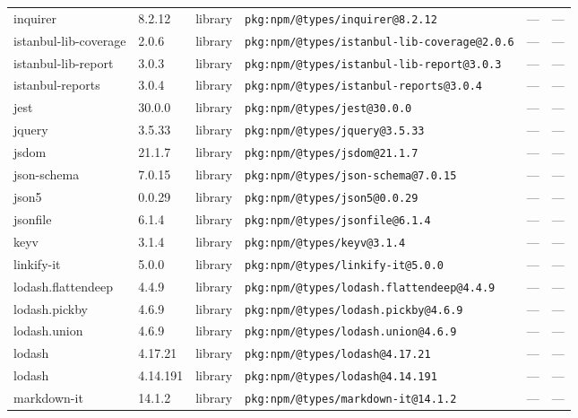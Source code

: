 \documentclass[11pt,a4paper]{article}
\begin{document}
\begin{longtable}{|p{4cm}|p{2cm}|p{1.6cm}|p{5cm}|p{1.5cm}|p{3.5cm}|}
\raggedright inquirer & 8.2.12 & library & \small\texttt{pkg:npm/@types/inquirer@8.2.12} & — & \small — \\
\raggedright istanbul-lib-coverage & 2.0.6 & library & \small\texttt{pkg:npm/@types/istanbul-lib-coverage@2.0.6} & — & \small — \\
\raggedright istanbul-lib-report & 3.0.3 & library & \small\texttt{pkg:npm/@types/istanbul-lib-report@3.0.3} & — & \small — \\
\raggedright istanbul-reports & 3.0.4 & library & \small\texttt{pkg:npm/@types/istanbul-reports@3.0.4} & — & \small — \\
\raggedright jest & 30.0.0 & library & \small\texttt{pkg:npm/@types/jest@30.0.0} & — & \small — \\
\raggedright jquery & 3.5.33 & library & \small\texttt{pkg:npm/@types/jquery@3.5.33} & — & \small — \\
\raggedright jsdom & 21.1.7 & library & \small\texttt{pkg:npm/@types/jsdom@21.1.7} & — & \small — \\
\raggedright json-schema & 7.0.15 & library & \small\texttt{pkg:npm/@types/json-schema@7.0.15} & — & \small — \\
\raggedright json5 & 0.0.29 & library & \small\texttt{pkg:npm/@types/json5@0.0.29} & — & \small — \\
\raggedright jsonfile & 6.1.4 & library & \small\texttt{pkg:npm/@types/jsonfile@6.1.4} & — & \small — \\
\raggedright keyv & 3.1.4 & library & \small\texttt{pkg:npm/@types/keyv@3.1.4} & — & \small — \\
\raggedright linkify-it & 5.0.0 & library & \small\texttt{pkg:npm/@types/linkify-it@5.0.0} & — & \small — \\
\raggedright lodash.flattendeep & 4.4.9 & library & \small\texttt{pkg:npm/@types/lodash.flattendeep@4.4.9} & — & \small — \\
\raggedright lodash.pickby & 4.6.9 & library & \small\texttt{pkg:npm/@types/lodash.pickby@4.6.9} & — & \small — \\
\raggedright lodash.union & 4.6.9 & library & \small\texttt{pkg:npm/@types/lodash.union@4.6.9} & — & \small — \\
\raggedright lodash & 4.17.21 & library & \small\texttt{pkg:npm/@types/lodash@4.17.21} & — & \small — \\
\raggedright lodash & 4.14.191 & library & \small\texttt{pkg:npm/@types/lodash@4.14.191} & — & \small — \\
\raggedright markdown-it & 14.1.2 & library & \small\texttt{pkg:npm/@types/markdown-it@14.1.2} & — & \small — \\

\end{longtable}
\end{document}
